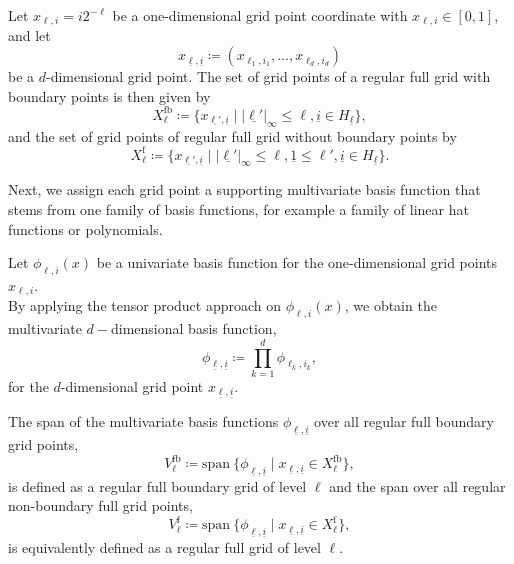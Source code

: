 \documentclass[
  a4paper,  %
  twoside,  %
  bibliography=totoc,
  headsepline,
  cleardoublepage=empty,
  parskip=half,
  draft=false
]{scrbook}
\begin{document}
\begin{definition}
Let $x_{\ell,i}=i2^{-\ell}$ be a one-dimensional grid point coordinate with $x_{\ell,i} \in [0,1]$, and let
\begin{equation}
x_{\underline{\ell},\underline{i}} \coloneqq (x_{\ell_1,i_1}, \dots, x_{\ell_d,i_d})
\end{equation}
be a $d$-dimensional grid point. The set of grid points of a regular full grid with boundary points is then given by
\begin{equation}
X^{\mathrm{fb}}_{\ell} \coloneqq \{x_{\underline{\ell'},\underline{i}} \mid |\underline{\ell'}|_{\infty} \leq \ell, \underline{i} \in H_{\underline{\ell}}\},
\end{equation}
and the set of grid points of regular full grid without boundary points by
\begin{equation}
X^{\mathrm{f}}_{\ell} \coloneqq \{x_{\underline{\ell'},\underline{i}} \mid |\underline{\ell'}|_{\infty} \leq \ell, \underline{1} \leq \ell',  \underline{i} \in H_{\underline{\ell}}\}.
\end{equation}
\end{definition}
%
Next, we assign each grid point a supporting multivariate basis function that stems from one family of basis functions, for example a family of linear hat functions or polynomials.

\begin{definition}
Let $\phi_{\ell,i}(x)$ be a univariate basis function for the one-dimensional grid points $x_{\ell,i}$.\\
By applying the tensor product approach on $\phi_{\ell,i}(x)$, we obtain the multivariate $d-$dimensional basis function,
\begin{equation}
\phi_{\underline{\ell},\underline{i}} \coloneqq \prod_{k=1}^{d} \phi_{\ell_k,i_k},
\end{equation}
for the $d$-dimensional grid point $x_{\underline{\ell},\underline{i}}$.
\label{def:basis_functions}
\end{definition}
%
\begin{definition}
The span of the multivariate basis functions $\phi_{\underline{\ell},\underline{i}}$ over all regular full boundary grid points,
\begin{equation}
V^{\mathrm{fb}}_{\ell} \coloneqq \mathrm{span}~ \{\phi_{\underline{\ell},\underline{i}} \mid x_{\underline{\ell},\underline{i}} \in X^{\mathrm{fb}}_{\ell}\},
\nonumber
\end{equation}
is defined as a regular full boundary grid of level $\ell$ and the span over all regular non-boundary full grid points,
\begin{equation}
V^{\mathrm{f}}_{\ell} \coloneqq \mathrm{span}~ \{\phi_{\underline{\ell},\underline{i}} \mid x_{\underline{\ell},\underline{i}} \in X^{\mathrm{f}}_{\ell}\},
\end{equation}
is equivalently defined as a regular full grid of level $\ell$.
\label{def:full_grid}
\end{definition}
\end{document}
